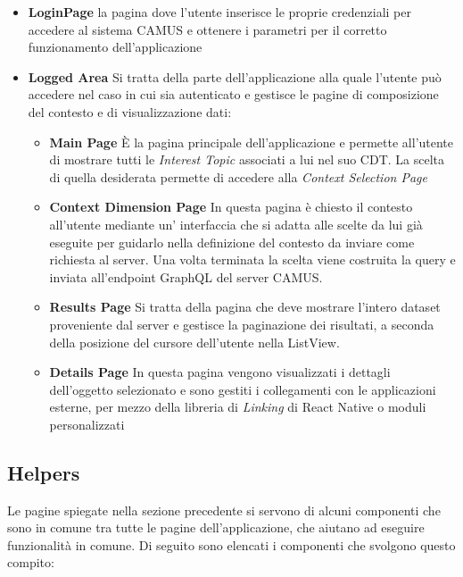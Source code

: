 \begin{itemize}
	\item \textbf{LoginPage} \upe la pagina dove l'utente inserisce le proprie credenziali per accedere al sistema CAMUS e ottenere i parametri per il corretto funzionamento dell'applicazione
	\item \textbf{Logged Area} Si tratta della parte dell'applicazione alla quale l'utente può accedere nel caso in cui sia autenticato e gestisce le pagine di composizione del contesto e di visualizzazione dati:
	\begin{itemize}
		\item \textbf{Main Page} È la pagina principale dell'applicazione e permette all'utente di mostrare tutti le \emph{Interest Topic} associati a lui nel suo CDT. La scelta di quella desiderata permette di accedere alla \emph{Context Selection Page}
		\item \textbf{Context Dimension Page} In questa pagina è chiesto il contesto all'utente mediante un' interfaccia che si adatta alle scelte da lui già eseguite per guidarlo nella definizione del contesto da inviare come richiesta al server. Una volta terminata la scelta viene costruita la query e inviata all'endpoint GraphQL del server CAMUS. 
		\item \textbf{Results Page} Si tratta della pagina che deve mostrare l'intero dataset proveniente dal server e gestisce la paginazione dei risultati, a seconda della posizione del cursore dell'utente nella ListView. 
		\item \textbf{Details Page} In questa pagina vengono visualizzati i dettagli dell'oggetto selezionato e sono gestiti i collegamenti con le applicazioni esterne, per mezzo della libreria di \emph{Linking} di React Native o moduli personalizzati
	\end{itemize}
\end{itemize}

\subsection{Helpers}
Le pagine spiegate nella sezione precedente si servono di alcuni componenti che sono in comune tra tutte le pagine dell'applicazione, che aiutano ad eseguire funzionalità in comune. Di seguito sono elencati i componenti che svolgono questo compito:


